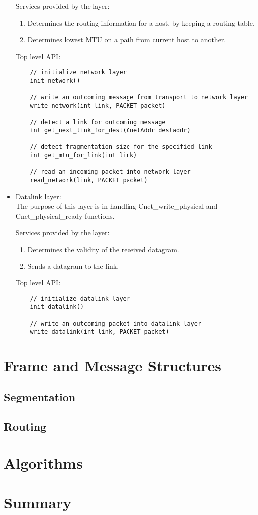 \documentclass{article}
\begin{document}
\begin{itemize}
		Services provided by the layer:
    \begin{enumerate}
      \item Determines the routing information for a host, by keeping a routing
      table.
      \item Determines lowest MTU on a path from current host to another.
    \end{enumerate}
		
    Top level API:
		
  \begin{verbatim}
    // initialize network layer
    init_network()
		
    // write an outcoming message from transport to network layer
    write_network(int link, PACKET packet)
		
    // detect a link for outcoming message
    int get_next_link_for_dest(CnetAddr destaddr)
		
    // detect fragmentation size for the specified link
    int get_mtu_for_link(int link) 
		
    // read an incoming packet into network layer
    read_network(link, PACKET packet)
  \end{verbatim}
		

\item	Datalink layer: \\
		The purpose of this layer is in handling Cnet\_write\_physical and
		Cnet\_physical\_ready functions. 
		
		Services provided by the layer:
    \begin{enumerate}
      \item Determines the validity of the received datagram.
      \item Sends a datagram to the link.
    \end{enumerate}
		
		Top level API:

  \begin{verbatim}
    // initialize datalink layer
    init_datalink()
		
    // write an outcoming packet into datalink layer
    write_datalink(int link, PACKET packet)
  \end{verbatim}

\end{itemize}

\section{Frame and Message Structures}

\subsection{Segmentation}

\subsection{Routing}

\section{Algorithms}

\section{Summary}
\end{document}
